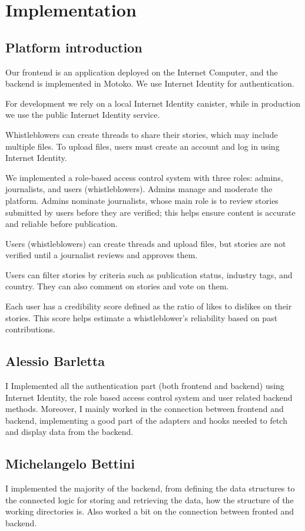 \documentclass[a4paper]{article}
\begin{document}
	\section*{Implementation}
	
	\subsection*{Platform introduction}
	Our frontend is an application deployed on the Internet Computer, and the
	backend is implemented in Motoko. We use Internet Identity for authentication.
	
	For development we rely on a local Internet Identity canister, while in
	production we use the public Internet Identity service.
	
	Whistleblowers can create threads to share their stories, which may include
	multiple files. To upload files, users must create an account and log in using
	Internet Identity.
	
	We implemented a role-based access control system with three roles: admins,
	journalists, and users (whistleblowers). Admins manage and moderate the
	platform. Admins nominate journalists, whose main role is to review stories
	submitted by users before they are verified; this helps ensure content is
	accurate and reliable before publication.
	
	Users (whistleblowers) can create threads and upload files, but stories are not
	verified until a journalist reviews and approves them.
	
	Users can filter stories by criteria such as publication status, industry tags,
	and country. They can also comment on stories and vote on them.
	
	Each user has a credibility score defined as the ratio of likes to dislikes on
	their stories. This score helps estimate a whistleblower's reliability based on
	past contributions.
	
	\subsection*{Alessio Barletta}
	I Implemented all the authentication part (both frontend and backend) using
	Internet Identity, the role based access control system and user related backend
	methods. Moreover, I mainly worked in the connection between frontend and
	backend, implementing a good part of the adapters and hooks needed to fetch and
	display data from the backend.
	
	\subsection*{Michelangelo Bettini}
	I implemented the majority of the backend, from defining the data structures to
	the connected logic for storing and retrieving the data, how the structure of
	the working directories is. Also worked a bit on the connection between fronted
	and backend.
	
\end{document}
